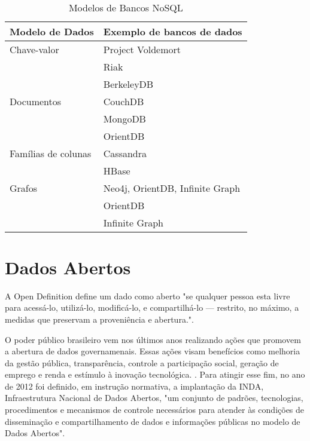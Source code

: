 ~\begin{table}[]
\centering
\caption{Modelos de Bancos NoSQL}
\label{tab:modelosnosql}
\begin{tabular}{ll}
\textbf{Modelo de Dados}     & \textbf{Exemplo de bancos de dados}      \\ \hline
Chave-valor         & Project Voldemort               \\
                    & Riak                            \\
                    & BerkeleyDB                      \\ \hline
Documentos          & CouchDB                         \\
                    & MongoDB                         \\
                    & OrientDB                        \\ \hline
Famílias de colunas & Cassandra                       \\
                    & HBase                           \\ \hline
Grafos              & Neo4j, OrientDB, Infinite Graph \\
                    & OrientDB                        \\
                    & Infinite Graph                 
\end{tabular}
\end{table}

\section{Dados Abertos}
A Open Definition define um dado como aberto "se qualquer pessoa esta livre para acessá-lo, utilizá-lo, modificá-lo, e compartilhá-lo — restrito, no máximo, a medidas que preservam a proveniência e abertura."\cite{opendefinition}.

O poder público brasileiro vem nos últimos anos realizando ações que promovem a abertura de dados governamenais. Essas ações visam benefícios como melhoria da gestão pública, transparência, controle a participação social, geração de emprego e renda e estímulo à inovação tecnológica. \cite{tcu}. Para atingir esse fim, no ano de 2012 foi definido, em instrução normativa, a implantação da INDA, Infraestrutura Nacional de Dados Abertos, "um conjunto de padrões, tecnologias, procedimentos e mecanismos de controle necessários para atender às condições de disseminação e compartilhamento de dados e informações públicas no modelo de Dados Abertos"\cite{inda}.  











